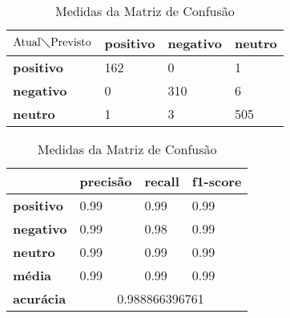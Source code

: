 \begin{table}[h!]
\centering
\begin{minipage}[b]{0.45\linewidth}
\caption{Matriz de Confusão Ternário: \textit{Decision Tree}}
\label{tab:mcb-nb}
\begin{tabular}{|l|l|l|l|}
\hline
$\textrm{Atual}\diagdown\textrm{Previsto}$ & \textbf{positivo} & \textbf{negativo} & \textbf{neutro}\\ \hline
\textbf{positivo} & 162 & 0 & 1\\ \hline
\textbf{negativo} & 0 & 310 & 6\\ \hline
\textbf{neutro} & 1 & 3 & 505\\ \hline
\end{tabular}
\end{minipage}
\hspace{0.5cm}
\begin{minipage}[b]{0.45\linewidth}

\centering
\caption{Medidas da Matriz de Confusão}
\label{tab:mmcb-nb}
\begin{tabular}{|l|l|l|l|}
\hline
         & \textbf{precisão} & \textbf{recall} & \textbf{f1-score} \\ \hline
\textbf{positivo} & 0.99     & 0.99   & 0.99     \\ \hline
\textbf{negativo} & 0.99     & 0.98   & 0.99     \\ \hline
\textbf{neutro} & 0.99     & 0.99   & 0.99     \\ \hline
\textbf{média} & 0.99     & 0.99   & 0.99     \\ \hline
\textbf{acurácia} & \multicolumn{3}{|c|}{0.988866396761}\\ \hline
\end{tabular}
\end{minipage}
\end{table}

